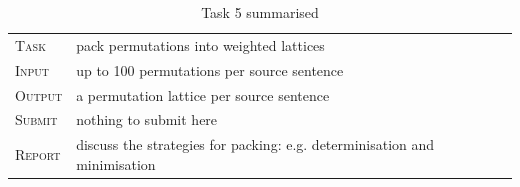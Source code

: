 \begin{table}[h]\centering
\begin{tabular}{l p{12cm}}
\textsc{Task}   &  pack permutations into weighted lattices\\
\textsc{Input}  &  up to 100 permutations per source sentence \\
\textsc{Output} &  a permutation lattice per source sentence\\
\textsc{Submit} &  nothing to submit here\\  
\textsc{Report} & discuss the strategies for packing: e.g. determinisation and minimisation\\
\end{tabular}
\caption{\label{tab:task5}Task 5 summarised}
\end{table}

